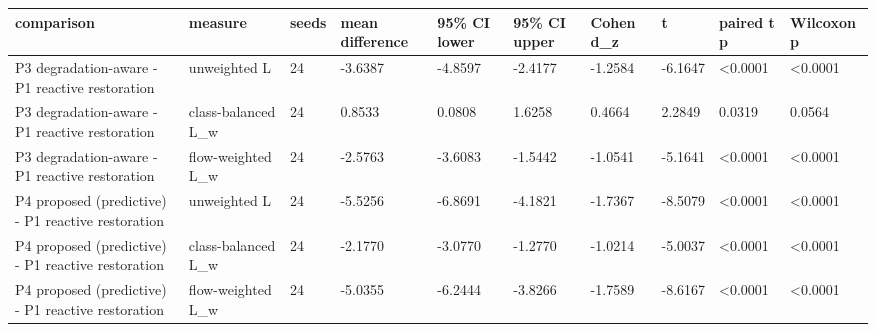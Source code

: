 \begin{tabular}{llllllllll}
\toprule
comparison & measure & seeds & mean difference & 95\% CI lower & 95\% CI upper & Cohen d\_z & t & paired t p & Wilcoxon p \\
\midrule
P3 degradation-aware - P1 reactive restoration & unweighted L & 24 & -3.6387 & -4.8597 & -2.4177 & -1.2584 & -6.1647 & <0.0001 & <0.0001 \\
P3 degradation-aware - P1 reactive restoration & class-balanced L\_w & 24 & 0.8533 & 0.0808 & 1.6258 & 0.4664 & 2.2849 & 0.0319 & 0.0564 \\
P3 degradation-aware - P1 reactive restoration & flow-weighted L\_w & 24 & -2.5763 & -3.6083 & -1.5442 & -1.0541 & -5.1641 & <0.0001 & <0.0001 \\
P4 proposed (predictive) - P1 reactive restoration & unweighted L & 24 & -5.5256 & -6.8691 & -4.1821 & -1.7367 & -8.5079 & <0.0001 & <0.0001 \\
P4 proposed (predictive) - P1 reactive restoration & class-balanced L\_w & 24 & -2.1770 & -3.0770 & -1.2770 & -1.0214 & -5.0037 & <0.0001 & <0.0001 \\
P4 proposed (predictive) - P1 reactive restoration & flow-weighted L\_w & 24 & -5.0355 & -6.2444 & -3.8266 & -1.7589 & -8.6167 & <0.0001 & <0.0001 \\
\bottomrule
\end{tabular}
